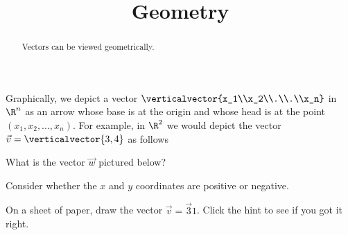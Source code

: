 \documentclass{ximera}
\title{Geometry}
\begin{document}
\begin{abstract}
  Vectors can be viewed geometrically.
\end{abstract}

Graphically, we depict a vector $\verticalvector{x_1\\x_2\\.\\.\\x_n}$
in $\R^n$ as an arrow whose base is at the origin and whose head is at
the point $(x_1,x_2,...,x_n)$.  For example, in $\R^2$ we would depict
the vector $\vec{v} = \verticalvector{3,4}$ as follows


\begin{question}
  What is the vector $\vec{w}$ pictured below?

  \begin{solution}
    \begin{hint}
      Consider whether the $x$ and $y$ coordinates are positive or negative.
    \end{hint}
    \begin{multiple-choice}
    \end{multiple-choice}
  \end{solution}
\end{question}
  	 
\begin{question}
  \begin{hint}
  \end{hint}
  On a sheet of paper, draw the vector $\vec{v} = \vec{3}{1}$. Click the hint to see if you got it right.
  
\end{question}
  	 
\end{document}
